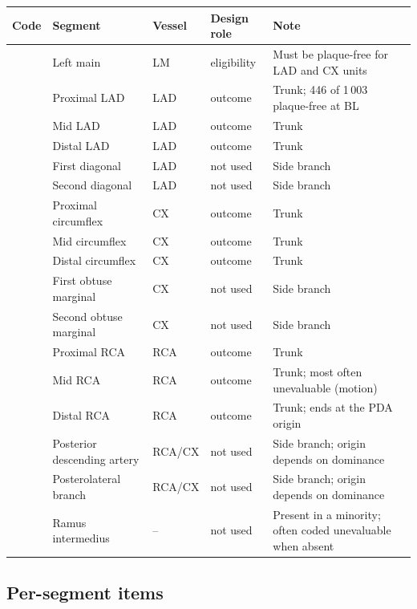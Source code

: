 \documentclass[11pt,a4paper]{article}
\begin{document}
\begin{longtable}{L{2.2cm} L{4.6cm} L{2.0cm} L{2.4cm} L{9.5cm}}
\toprule
Code & Segment & Vessel & Design role & Note \\
\midrule
\endhead
{}   & Left main                     & LM  & eligibility & Must be plaque-free for LAD and CX units \\
 & Proximal LAD                  & LAD & outcome     & Trunk; 446 of 1\,003 plaque-free at BL \\
 & Mid LAD                       & LAD & outcome     & Trunk \\
 & Distal LAD                    & LAD & outcome     & Trunk \\
   & First diagonal                & LAD & not used    & Side branch \\
   & Second diagonal               & LAD & not used    & Side branch \\
  & Proximal circumflex           & CX  & outcome     & Trunk \\
  & Mid circumflex                & CX  & outcome     & Trunk \\
  & Distal circumflex             & CX  & outcome     & Trunk \\
  & First obtuse marginal         & CX  & not used    & Side branch \\
  & Second obtuse marginal        & CX  & not used    & Side branch \\
 & Proximal RCA                  & RCA & outcome     & Trunk \\
 & Mid RCA                       & RCA & outcome     & Trunk; most often unevaluable (motion) \\
 & Distal RCA                    & RCA & outcome     & Trunk; ends at the PDA origin \\
  & Posterior descending artery   & RCA/CX & not used & Side branch; origin depends on dominance \\
  & Posterolateral branch         & RCA/CX & not used & Side branch; origin depends on dominance \\
   & Ramus intermedius             & --  & not used    & Present in a minority; often coded unevaluable when absent \\
\bottomrule
\end{longtable}

\subsection{Per-segment items}
\end{document}

